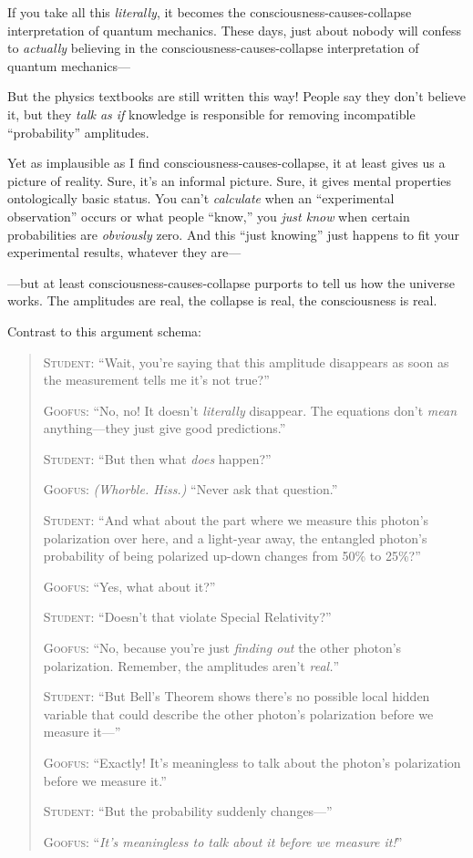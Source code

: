 {
 If you take all this \textit{literally}, it becomes the
consciousness-causes-collapse interpretation of quantum mechanics.
These days, just about nobody will confess to \textit{actually}
believing in the consciousness-causes-collapse interpretation of
quantum mechanics---}

{
 But the physics textbooks are still written this way! People say
they don't believe it, but they \textit{talk as if}
knowledge is responsible for removing incompatible
``probability'' amplitudes.}

{
 Yet as implausible as I find consciousness-causes-collapse, it at
least gives us a picture of reality. Sure, it's an
informal picture. Sure, it gives mental properties ontologically basic
status. You can't \textit{calculate} when an
``experimental observation'' occurs
or what people ``know,'' you
\textit{just know} when certain probabilities are \textit{obviously}
zero. And this ``just knowing'' just
happens to fit your experimental results, whatever they are---}

{
 {}---but at least consciousness-causes-collapse purports to tell
us how the universe works. The amplitudes are real, the collapse is
real, the consciousness is real.}

{
 Contrast to this argument schema:}

\begin{quotation}
{
 \textsc{Student}: ``Wait, you're saying
that this amplitude disappears as soon as the measurement tells me
it's not true?''}

{
 \textsc{Goofus}: ``No, no! It doesn't
\textit{literally} disappear. The equations don't
\textit{mean} anything---they just give good
predictions.''}

{
 \textsc{Student}: ``But then what \textit{does}
happen?''}

{
 \textsc{Goofus}: \textit{(Whorble. Hiss.)} ``Never ask
that question.''}

{
 \textsc{Student}: ``And what about the part where we
measure this photon's polarization over here, and a
light-year away, the entangled photon's probability of
being polarized up-down changes from 50\% to 25\%?''}

{
 \textsc{Goofus}: ``Yes, what about
it?''}

{
 \textsc{Student}: ``Doesn't that violate
Special Relativity?''}

{
 \textsc{Goofus}: ``No, because you're just
\textit{finding out} the other photon's polarization.
Remember, the amplitudes aren't
\textit{real.}''}

{
 \textsc{Student}: ``But Bell's Theorem
shows there's no possible local hidden variable that
could describe the other photon's polarization before
we measure it---''}

{
 \textsc{Goofus}: ``Exactly! It's
meaningless to talk about the photon's polarization
before we measure it.''}

{
 \textsc{Student}: ``But the probability suddenly
changes---''}

{
 \textsc{Goofus}: ``\textit{It's
meaningless to talk about it before we measure
it!}''}
\end{quotation}

